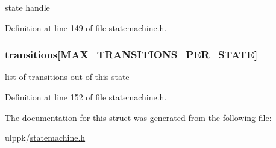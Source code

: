 state handle 



Definition at line 149 of file statemachine.\-h.

\hypertarget{struct__state__struct_a25a7e5dd77b0d5c38ccdcc33de2302fd}{
\subsubsection[{transitions}]{ transitions\mbox{[}{\bf M\-A\-X\-\_\-\-T\-R\-A\-N\-S\-I\-T\-I\-O\-N\-S\-\_\-\-P\-E\-R\-\_\-\-S\-T\-A\-T\-E}\mbox{]}}}\label{struct__state__struct_a25a7e5dd77b0d5c38ccdcc33de2302fd}


list of transitions out of this state 



Definition at line 152 of file statemachine.\-h.



The documentation for this struct was generated from the following file\-:\begin{DoxyCompactItemize}
\item 
ulppk/\hyperlink{statemachine_8h}{statemachine.\-h}\end{DoxyCompactItemize}

